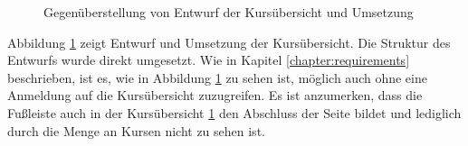\begin{figure}[p]
\begin{subfigure}{\textwidth}
	            \end{subfigure}
	            \caption{Gegenüberstellung von Entwurf der Kursübersicht und Umsetzung}
	            \label{fig:comparisonCourses}
	        \end{figure}
	    
    
        Abbildung \ref{fig:comparisonCourses} zeigt Entwurf und Umsetzung der Kursübersicht.
        Die Struktur des Entwurfs wurde direkt umgesetzt.
        Wie in Kapitel \ref{chapter:requirements} beschrieben, ist es, wie in Abbildung \ref{fig:comparisonCourses} zu sehen ist, möglich auch ohne eine Anmeldung auf die Kursübersicht zuzugreifen.
        Es ist anzumerken, dass die Fußleiste auch in der Kursübersicht \ref{fig:comparisonCourses} den Abschluss der Seite bildet und lediglich durch die Menge an Kursen nicht zu sehen ist.
